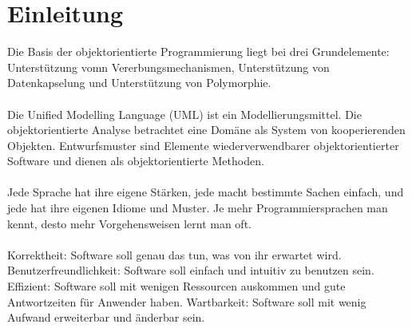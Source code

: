 \section{Einleitung}
Die Basis der objektorientierte Programmierung liegt bei drei Grundelemente: Unterstützung vomn Vererbungsmechanismen, Unterstützung von Datenkapselung und Unterstützung von Polymorphie.
\\\\
Die Unified Modelling Language (UML) ist ein Modellierungsmittel. Die objektorientierte Analyse betrachtet eine Domäne als System von kooperierenden Objekten. Entwurfsmuster sind Elemente wiederverwendbarer objektorientierter Software und dienen als objektorientierte Methoden.
\\\\
Jede Sprache hat ihre eigene Stärken, jede macht bestimmte Sachen einfach, und jede hat ihre eigenen Idiome und Muster. Je mehr Programmiersprachen man kennt, desto mehr Vorgehensweisen lernt man oft.
\\\\
Korrektheit: Software soll genau das tun, was von ihr erwartet wird. Benutzerfreundlichkeit: Software soll einfach und intuitiv zu benutzen sein. Effizient: Software soll mit wenigen Ressourcen auskommen und gute Antwortzeiten für Anwender haben. Wartbarkeit: Software soll mit wenig Aufwand erweiterbar und änderbar sein.
